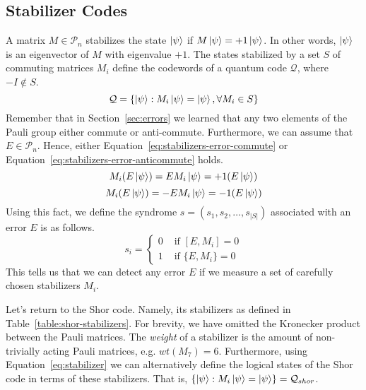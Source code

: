 \subsection{Stabilizer Codes}

A matrix $M\in\mathcal{P}_n$ stabilizes the state $\ket{\psi}$ if $M\ket{\psi} = +1\ket{\psi}$. In other words, $\ket{\psi}$ is an eigenvector of $M$ with eigenvalue $+1$. The states stabilized by a set $S$ of commuting matrices $M_{i}$ define the codewords of a quantum code $\mathcal{Q}$, where $-I \notin S$.
\begin{equation}\label{eq:stabilizer}
    \mathcal{Q} = \{\ket{\psi} : M_{i}\ket{\psi} = \ket{\psi}, \forall{}M_{i} \in S\}
\end{equation}
Remember that in Section~\ref{sec:errors} we learned that any two elements of the Pauli group either commute or anti-commute. Furthermore, we can assume that $E\in\mathcal{P}_{n}$. Hence, either Equation~\ref{eq:stabilizers-error-commute} or Equation~\ref{eq:stabilizers-error-anticommute} holds.
\begin{equation}\label{eq:stabilizers-error-commute}
    M_{i}(E\ket{\psi}) = EM_{i}\ket{\psi} = +1(E\ket{\psi})
\end{equation}
\begin{equation}\label{eq:stabilizers-error-anticommute}
    M_{i}(E\ket{\psi}) = -EM_{i}\ket{\psi} = -1(E\ket{\psi})
\end{equation}
Using this fact, we define the syndrome $s = (s_{1},s_{2},\ldots, s_{|S|})$ associated with an error $E$ is as follows.
\begin{equation}
    s_{i} = \begin{cases}
            0 & \text{ if }[E, M_{i}] = 0\\ 
            1 & \text{ if }\{E, M_{i}\} = 0\end{cases}
\end{equation}
This tells us that we can detect any error $E$ if we measure a set of carefully chosen stabilizers $M_{i}$.

\smallskip 

\noindent
Let's return to the Shor code. Namely, its stabilizers as defined in Table~\ref{table:shor-stabilizers}. For brevity, we have omitted the Kronecker product between the Pauli matrices. The \textit{weight} of a stabilizer is the amount of non-trivially acting Pauli matrices, e.g. $wt(M_7) = 6$. Furthermore, using Equation~\ref{eq:stabilizer} we can alternatively define the logical states of the Shor code in terms of these stabilizers. That is, $\{\ket{\psi} : M_{i}\ket{\psi} = \ket{\psi}\} = \mathcal{Q}_{shor}$.

